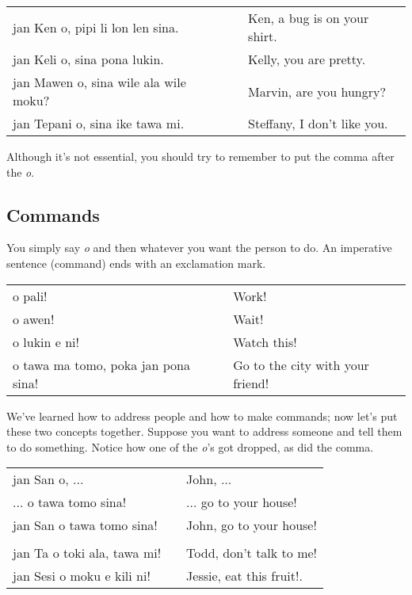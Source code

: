 \begin{supertabular}{p{5,5cm}|ll}
jan Ken o, pipi li lon len sina. && Ken, a bug is on your shirt. \\
jan Keli o, sina pona lukin. && Kelly, you are pretty. \\
jan Mawen o, sina wile ala wile moku? && Marvin, are you hungry? \\
jan Tepani o, sina ike tawa mi. && Steffany, I don't like you. \\
\end{supertabular} 

Although it's not essential, you should try to remember to put the comma after the \textit{o}. 

%
\subsection*{Commands}
%
You simply say \textit{o} and then whatever you want the person to do. 
An imperative sentence (command) ends with an exclamation mark.

\begin{supertabular}{p{5,5cm}|ll}
o pali! && Work! \\
o awen! && Wait! \\
o lukin e ni! && Watch this! \\
o tawa ma tomo, poka jan pona sina! && Go to the city with your friend! \\
\end{supertabular} 

We've learned how to address people and how to make commands; now let's put these two concepts together. 
Suppose you want to address someone and tell them to do something. 
Notice how one of the \textit{o}'s got dropped, as did the comma. 

\begin{supertabular}{p{5,5cm}|ll}
jan San o, ...  && John, ... \\
 ... o tawa tomo sina! && ... go to your house! \\
jan San o tawa tomo sina!  && John, go to your house! \\
 && \\ %
jan Ta o toki ala, tawa mi! && Todd, don't talk to me! \\
jan Sesi o moku e kili ni! && Jessie, eat this fruit!. \\
\end{supertabular} 

